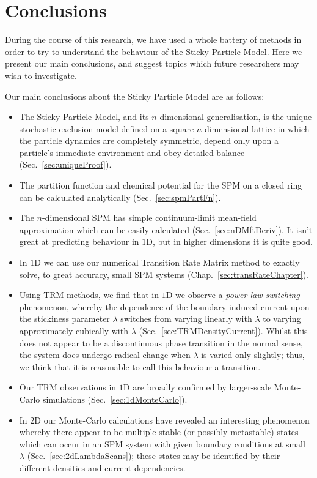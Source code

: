 \chapter{Conclusions} \label{sec:conclusionsChap}
During the course of this research, we have used a whole battery of methods in order to try to understand
the behaviour of the Sticky Particle Model. Here we present our main conclusions, and suggest topics which
future researchers may wish to investigate.

Our main conclusions about the Sticky Particle Model are as follows:
\begin{itemize}
 \item The Sticky Particle Model, and its $n$-dimensional generalisation, is the unique stochastic exclusion 
 model defined on a square $n$-dimensional lattice in which the particle dynamics are completely symmetric,
 depend only upon a particle's immediate environment and obey detailed balance (Sec.~\ref{sec:uniqueProof}).
 \item The partition function and chemical potential for the SPM on a closed ring can be calculated analytically (Sec.~\ref{sec:spmPartFn}).
 \item The $n$-dimensional SPM has simple continuum-limit mean-field approximation which can be easily
 calculated (Sec.~\ref{sec:nDMftDeriv}). It isn't great at predicting behaviour in $1$D, but in higher dimensions
 it is quite good.
 \item In $1$D we can use our numerical Transition Rate Matrix method to exactly solve, to great accuracy,
 small SPM systems (Chap.~\ref{sec:transRateChapter}).
 \item Using TRM methods, we find that in $1$D we observe a \textit{power-law switching} phenomenon, whereby the dependence of the boundary-induced current upon the stickiness parameter $\lambda$ switches from
 varying linearly with $\lambda$ to varying approximately cubically with $\lambda$ 
 (Sec.~\ref{sec:TRMDensityCurrent}). Whilst this does not appear to be a discontinuous phase transition in the
 normal sense, the system does undergo radical change when $\lambda$ is varied only slightly; thus, we think that it is reasonable to call this behaviour a transition.
 \item Our TRM observations in $1$D are broadly confirmed by larger-scale Monte-Carlo simulations 
 (Sec.~\ref{sec:1dMonteCarlo}).
 \item In $2$D our Monte-Carlo calculations have revealed an interesting phenomenon whereby there appear
 to be multiple stable (or possibly metastable) states which can occur in an SPM system with given boundary
 conditions at small $\lambda$ (Sec.~\ref{sec:2dLambdaScans}); these states may be identified by their 
 different densities and current dependencies.
\end{itemize}

